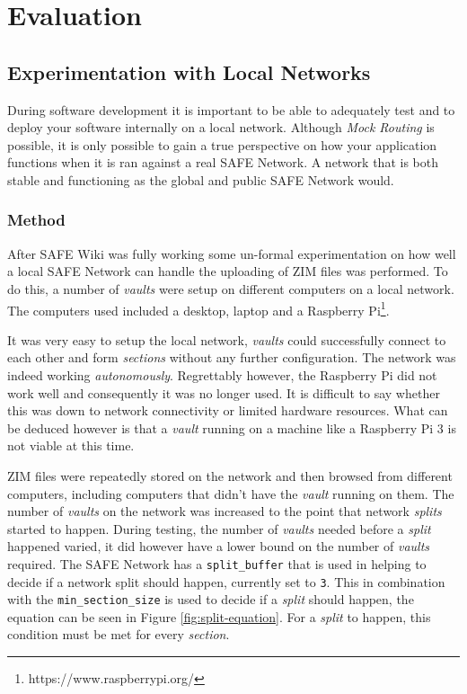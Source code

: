 \chapter{Evaluation}

\section{Experimentation with Local Networks}

During software development it is important to be able to adequately test and to deploy your software internally on a local network. Although \textit{Mock Routing} is possible, it is only possible to gain a true perspective on how your application functions when it is ran against a real SAFE Network. A network that is both stable and functioning as the global and public SAFE Network would.

\subsection{Method}

After SAFE Wiki was fully working some un-formal experimentation on how well a local SAFE Network can handle the uploading of ZIM files was performed. To do this, a number of \textit{vaults} were setup on different computers on a local network. The computers used included a desktop, laptop and a Raspberry Pi\footnote{https://www.raspberrypi.org/}.

It was very easy to setup the local network, \textit{vaults} could successfully connect to each other and form \textit{sections} without any further configuration. The network was indeed working \textit{autonomously}. Regrettably however, the Raspberry Pi did not work well and consequently it was no longer used. It is difficult to say whether this was down to network connectivity or limited hardware resources. What can be deduced however is that a \textit{vault} running on a machine like a Raspberry Pi 3 is not viable at this time.

ZIM files were repeatedly stored on the network and then browsed from different computers, including computers that didn't have the \textit{vault} running on them. The number of \textit{vaults} on the network was increased to the point that network \textit{splits} started to happen. During testing, the number of \textit{vaults} needed before a \textit{split} happened varied, it did however have a lower bound on the number of \textit{vaults} required. The SAFE Network has a \texttt{split\_buffer} that is used in helping to decide if a network split should happen, currently set to \texttt{3}. This in combination with the \texttt{min\_section\_size} is used to decide if a \textit{split} should happen, the equation can be seen in Figure \ref{fig:split-equation}. For a \textit{split} to happen, this condition must be met for every \textit{section}.

